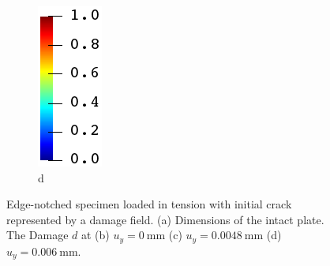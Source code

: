 \begin{figure}[htb!]
\begin{subfigure}[b]{0.21\textwidth}
    \caption{}
  \end{subfigure}
  \begin{subfigure}[b]{0.06\textwidth}
    \centering
    \caption*{d}
    \includegraphics[width=\textwidth]{Chapter4/figures/jet_vertical.png}
    \vspace{0.15in}
  \end{subfigure}
  \caption{ Edge-notched specimen loaded in tension  with initial crack represented by a damage field.  (a) Dimensions of the intact plate. The  Damage $d$ at (b) $u_y = \SI{0}{\milli\meter}$ (c) $u_y = \SI{0.0048}{\milli\meter}$ (d) $u_y = \SI{0.006}{\milli\meter}$. }
  \label{fig: Chapter4/mode1_intact_plate}
\end{figure}
